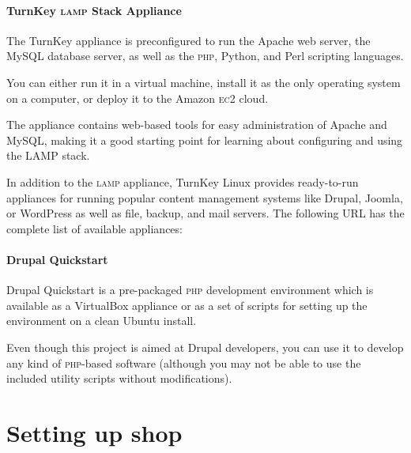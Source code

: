 \documentclass[final,ebook,10pt,twoside,openright]{memoir}
\begin{document}
\subsection*{TurnKey \textsc{lamp} Stack Appliance}

The TurnKey appliance is preconfigured to run the Apache web server, the MySQL database server, as well as the \textsc{php}, Python, and Perl scripting languages.


You can either run it in a virtual machine, install it as the only operating system on a computer, or deploy it to the Amazon \textsc{ec2} cloud.

The appliance contains web-based tools for easy administration of Apache and MySQL, making it a good starting point for learning about configuring and using the \textsc{LAMP} stack.

In addition to the \textsc{lamp} appliance, TurnKey Linux provides ready-to-run appliances for running popular content management systems like Drupal, Joomla, or WordPress as well as file, backup, and mail servers. The following URL has the complete list of available appliances:


\subsection*{Drupal Quickstart}

Drupal Quickstart is a pre-packaged \textsc{php} development environment which is available as a VirtualBox appliance or as a set of scripts for setting up the environment on a clean Ubuntu install.


Even though this project is aimed at Drupal developers, you can use it to develop any kind of \textsc{php}-based software (although you may not be able to use the included utility scripts without modifications).


\mainmatter

\part{Setting up shop}

\end{document}

